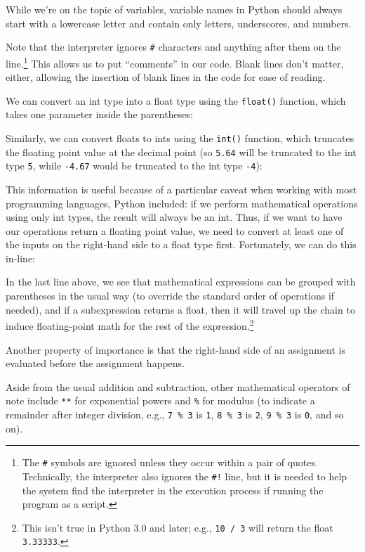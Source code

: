 \documentclass[
]{memoir}
\begin{document}
While we're on the topic of variables, variable names in Python should always start with a lowercase letter and contain only letters, underscores, and numbers.

Note that the interpreter ignores \texttt{\#} characters and anything after them on the line.\footnote{The \texttt{\#} symbols are ignored unless they occur within a pair of quotes. Technically, the interpreter also ignores the \texttt{\#!} line, but it is needed to help the system find the interpreter in the execution process if running the program as a script.} This allows us to put \enquote{comments} in our code. Blank lines don't matter, either, allowing the insertion of blank lines in the code for ease of reading.

We can convert an int type into a float type using the \texttt{float()} function, which takes one parameter inside the parentheses:

Similarly, we can convert floats to ints using the \texttt{int()} function, which truncates the floating point value at the decimal point (so \texttt{5.64} will be truncated to the int type \texttt{5}, while \texttt{-4.67} would be truncated to the int type \texttt{-4}):

This information is useful because of a particular caveat when working with most programming languages, Python included: if we perform mathematical operations using only int types, the result will always be an int. Thus, if we want to have our operations return a floating point value, we need to convert at least one of the inputs on the right-hand side to a float type first. Fortunately, we can do this in-line:

In the last line above, we see that mathematical expressions can be grouped with parentheses in the usual way (to override the standard order of operations if needed), and if a subexpression returns a float, then it will travel up the chain to induce floating-point math for the rest of the expression.\footnote{This isn't true in Python 3.0 and later; e.g., \texttt{10\ /\ 3} will return the float \texttt{3.33333}.}

Another property of importance is that the right-hand side of an assignment is evaluated before the assignment happens.

Aside from the usual addition and subtraction, other mathematical operators of note include \texttt{**} for exponential powers and \texttt{\%} for modulus (to indicate a remainder after integer division, e.g., \texttt{7\ \%\ 3} is \texttt{1}, \texttt{8\ \%\ 3} is \texttt{2}, \texttt{9\ \%\ 3} is \texttt{0}, and so on).
\end{document}
